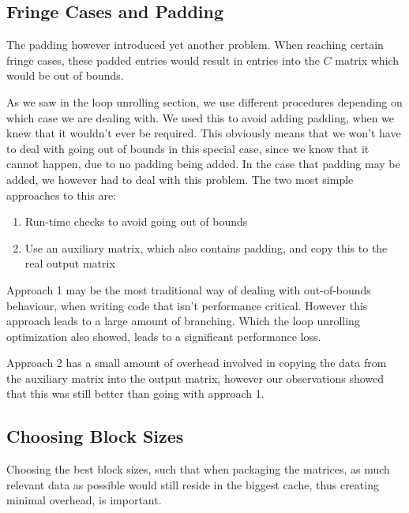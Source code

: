 \documentclass[a4paper,11pt,oneside]{book}
\begin{document}
\subsection{Fringe Cases and Padding}

The padding however introduced yet another problem. When reaching certain fringe
cases, these padded entries would result in entries into the $C$ matrix which
would be out of bounds.

As we saw in the loop unrolling section, we use different procedures depending
on which case we are dealing with. We used this to avoid adding padding, when we
knew that it wouldn't ever be required. This obviously means that we won't have
to deal with going out of bounds in this special case, since we know that it
cannot happen, due to no padding being added. In the case that padding may be
added, we however had to deal with this problem. The two most simple approaches 
to this are:

\begin{enumerate}
  \item Run-time checks to avoid going out of bounds
  \item Use an auxiliary matrix, which also contains padding, and copy this to 
        the real output matrix
\end{enumerate}

Approach 1 may be the most traditional way of dealing with out-of-bounds
behaviour, when writing code that isn't performance critical. However this
approach leads to a large amount of branching. Which the loop unrolling
optimization also showed, leads to a significant performance loss.

Approach 2 has a small amount of overhead involved in copying the data from the
auxiliary matrix into the output matrix, however our observations showed that
this was still better than going with approach 1.


\subsection{Choosing Block Sizes}
Choosing the best block sizes, such that when packaging the matrices, as much
relevant data as possible would still reside in the biggest cache, thus creating
minimal overhead, is important.
\end{document}
